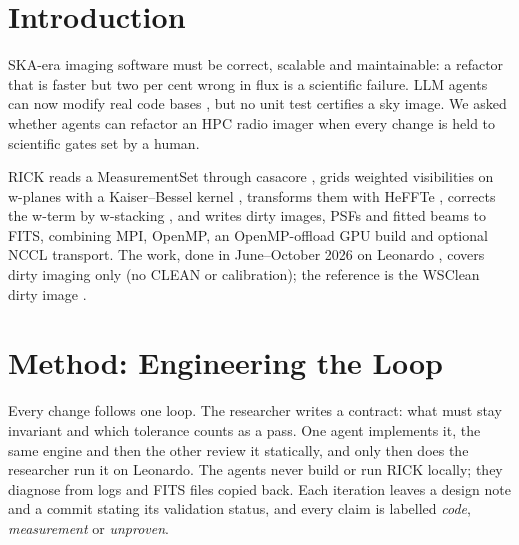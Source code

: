\documentclass[11pt,twoside]{article}
\begin{document}


\section{Introduction}

SKA-era imaging software must be correct, scalable and maintainable: a
refactor that is faster but two per cent wrong in flux is a scientific
failure. LLM agents can now modify real code bases \citep[e.g.][]{Jimenez2024},
but no unit test certifies a sky image. We asked whether agents can refactor
an HPC radio imager when every change is held to scientific gates set by a
human.

RICK \citep{DeRubeis2025,Lacopo2025,Lacopo2026} reads a MeasurementSet through
casacore \citep{2015A&C....12..174V}, grids weighted visibilities on w-planes
with a Kaiser--Bessel kernel \citep{Jackson1991}, transforms them with HeFFTe
\citep{Ayala2020}, corrects the w-term by w-stacking
\citep{2014MNRAS.444..606O}, and writes dirty images, PSFs and fitted beams to
FITS, combining MPI, OpenMP, an OpenMP-offload GPU build and optional NCCL
transport. The work, done in June--October 2026 on Leonardo \citep{Turisini2024},
covers dirty imaging only (no CLEAN or calibration); the reference is the
WSClean dirty image \citep{2014MNRAS.444..606O}.

\section{Method: Engineering the Loop}

Every change follows one loop. The researcher writes a contract: what must
stay invariant and which tolerance counts as a pass. One agent implements it,
the same engine and then the other review it statically, and only then does
the researcher run it on Leonardo. The agents never build or run RICK locally;
they diagnose from logs and FITS files copied back. Each iteration leaves a
design note and a commit stating its validation status, and every claim is
labelled \emph{code}, \emph{measurement} or \emph{unproven}.
\end{document}
